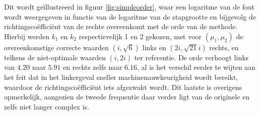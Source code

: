 \documentclass[12pt]{article}
\begin{document}
Dit wordt geïllustreerd in figuur \ref{fig:simpleorder}, waar een logaritme van de fout wordt weergegeven in functie van de logaritme van de stapgrootte en bijgevolg de richtingscoëfficiënt van de rechte overeenkomt met de orde van de methode. Hierbij werden \(k_1\) en \(k_2\) respectievelijk 1 en 2 gekozen, met voor \((\mu_1,\mu_2)\) de overeenkomstige correcte waarden \((i,\sqrt{6})\) links en \((2i,\sqrt{21}i)\) rechts, en telkens de niet-optimale waarden \((i,2i)\) ter referentie. De orde verhoogt links van \(4.20\) naar \(5.91\) en rechts zelfs naar \(6.16\), al is het verschil eerder te wijten aan het feit dat in het linkergeval sneller machinenauwkeurigheid wordt bereikt, waardoor de richtingscoëfficiënt iets afgezwakt wordt. Dit laatste is overigens opmerkelijk, aangezien de tweede frequentie daar verder ligt van de originele en zelfs niet langer complex is.
\end{document}
